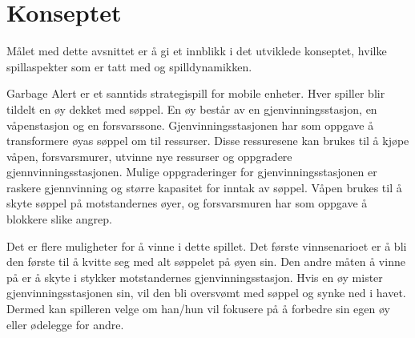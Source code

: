 \section{Konseptet}
Målet med dette avsnittet er å gi et innblikk i det utviklede konseptet,
hvilke spillaspekter som er tatt med og spilldynamikken.

Garbage Alert er et sanntids strategispill for mobile enheter. Hver spiller blir tildelt en øy dekket med søppel. En øy består av en gjenvinningsstasjon, en våpenstasjon og en forsvarssone. Gjenvinningsstasjonen har som oppgave å transformere øyas søppel om til ressurser. Disse ressuresene kan brukes til å kjøpe våpen, forsvarsmurer, utvinne nye ressurser og oppgradere gjennvinningsstasjonen. Mulige oppgraderinger for gjenvinningsstasjonen er raskere gjennvinning og større kapasitet for inntak av søppel. Våpen brukes til å skyte søppel på motstandernes øyer, og forsvarsmuren har som oppgave å blokkere slike angrep. 

Det er flere muligheter for å vinne i dette spillet. Det første vinnsenarioet er å bli den første til å kvitte seg med alt søppelet på øyen sin. Den andre måten å vinne på er å skyte i stykker motstandernes gjenvinningsstasjon. Hvis en øy mister gjenvinningsstasjonen sin, vil den bli oversvømt med søppel og synke ned i havet. Dermed kan spilleren velge om han/hun vil fokusere på å forbedre sin egen øy eller ødelegge for andre. 